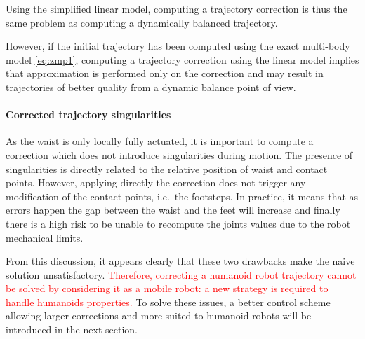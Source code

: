 Using the simplified linear model, computing a trajectory correction is thus
the same problem as computing a dynamically balanced trajectory.

However, if the initial trajectory has been computed using the exact
multi-body model \ref{eq:zmp1}, computing a trajectory correction
using the linear model implies that approximation is performed only on
the correction and may result in trajectories of better quality from a
dynamic balance point of view.

\paragraph{Corrected trajectory singularities}
As the waist is only locally fully actuated, it is important to compute
a correction which does not introduce singularities during motion. The
presence of singularities is directly related to the relative position
of waist and contact points. However, applying directly the correction
does not trigger any modification of the contact points, i.e.\ the
footsteps. In practice, it means that as errors happen the gap between
the waist and the feet will increase and finally there is a high risk
to be unable to recompute the joints values due to the robot
mechanical limits.


From this discussion, it appears clearly that these two drawbacks make
the naive solution unsatisfactory. \textcolor{red}{Therefore,
  correcting a humanoid robot trajectory cannot be solved by
  considering it as a mobile robot: a new strategy is required to
  handle humanoids properties.}  To solve these issues, a better
control scheme allowing larger corrections and more suited to humanoid
robots will be introduced in the next section.


\FloatBarrier

